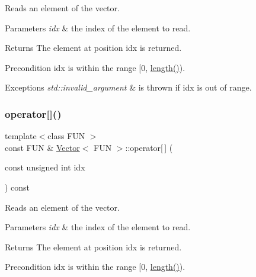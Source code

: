 Reads an element of the vector. 


\begin{DoxyParams}{Parameters}
{\em idx} & the index of the element to read. \\
\hline
\end{DoxyParams}
\begin{DoxyReturn}{Returns}
The element at position idx is returned.
\end{DoxyReturn}
\begin{DoxyPrecond}{Precondition}
idx is within the range \mbox{[}0, \hyperlink{classVector_ab89f11fa1d0aadc25484f4971f16f38a}{length()}). 
\end{DoxyPrecond}

\begin{DoxyExceptions}{Exceptions}
{\em std\+::invalid\+\_\+argument} & is thrown if idx is out of range. \\
\hline
\end{DoxyExceptions}
\mbox{\label{classVector_a3e0e1eb0aea867284f13efb6bc21f2bf}} 
\subsubsection{\texorpdfstring{operator[]()}{operator[]()}\hspace{0.1cm}{\footnotesize\ttfamily [2/2]}}
{\footnotesize\ttfamily template$<$class F\+UN $>$ \\
const F\+UN \& \hyperlink{classVector}{Vector}$<$ F\+UN $>$\+::operator\mbox{[}$\,$\mbox{]} (\begin{DoxyParamCaption}\item[{const unsigned int}]{idx }\end{DoxyParamCaption}) const}



Reads an element of the vector. 


\begin{DoxyParams}{Parameters}
{\em idx} & the index of the element to read. \\
\hline
\end{DoxyParams}
\begin{DoxyReturn}{Returns}
The element at position idx is returned.
\end{DoxyReturn}
\begin{DoxyPrecond}{Precondition}
idx is within the range \mbox{[}0, \hyperlink{classVector_ab89f11fa1d0aadc25484f4971f16f38a}{length()}). 
\end{DoxyPrecond}

